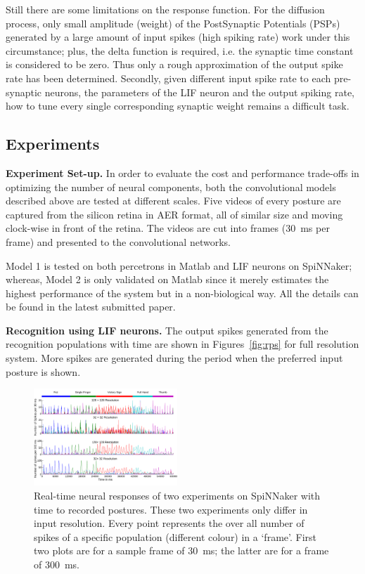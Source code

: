 \documentclass[journal]{journal}
\begin{document}
Still there are some limitations on the response function. 
For the diffusion process, only small amplitude (weight) of the PostSynaptic Potentials (PSPs) generated by a large amount of input spikes (high spiking rate) work under this circumstance; 
plus, the delta function is required, i.e. the synaptic time constant is considered to be zero. Thus only a rough approximation of the output spike rate has been determined.
Secondly, given different input spike rate to each pre-synaptic neurons, the parameters of the LIF neuron and the output spiking rate, how to tune every single corresponding synaptic weight remains a difficult task.

\subsection{Experiments}
\textbf{Experiment Set-up.}
In order to evaluate the cost and performance trade-offs in optimizing the number of neural components, both the convolutional models described above are tested at different scales. 
Five videos of every posture are captured from the silicon retina in AER format, all of similar size and moving clock-wise in front of the retina. 
The videos are cut into frames (30~ms per frame) and presented to the convolutional networks. 

Model 1 is tested on both percetrons in Matlab and LIF neurons on SpiNNaker;
whereas, Model 2 is only validated on Matlab since it merely estimates the highest performance of the system but in a non-biological way.
All the details can be found in the latest submitted paper.

\textbf{Recognition using LIF neurons.}
The output spikes generated from the recognition populations with time are shown in Figures~\ref{fig:rps} for full resolution system. 
More spikes are generated during the period when the preferred input posture is shown. 


\begin{figure}[h!]
\centering
	\includegraphics[width=0.48\textwidth]{pics/rateSpiNN.pdf}
	\caption{Real-time neural responses of two experiments on SpiNNaker with time to recorded postures.
	These two experiments only differ in input resolution.
	Every point represents the over all number of spikes of a specific population (different colour) in a `frame'.
	First two plots are for a sample frame of 30~ms; the latter are for a frame of 300~ms.
	}
	\label{fig:spikerec}
\end{figure}
\end{document}
